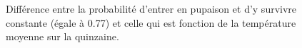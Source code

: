 \begin{figure}[ht]
 \centering
 \caption{Différence entre la probabilité d'entrer en pupaison et d'y survivre constante (égale à 0.77) et celle qui est fonction de la température moyenne sur la quinzaine.}
 \label{fig:pupaison}
\end{figure}
%

% 
% 
% 
% 
% 

